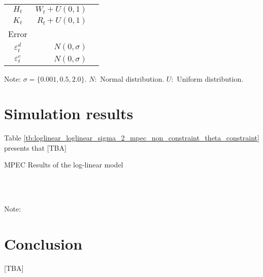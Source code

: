 \documentclass[11pt, a4paper]{article}
\begin{document}
\begin{table}[!htbp]
\begin{center}
{\begin{tabular}{crr}
            $H_{t}$ & $W_{t}+U(0,1)$  \\
            $K_{t}$ & $R_{t}+U(0,1)$  \\
            Error&  &  \\
            $\varepsilon^{d}_{t}$ & $N(0,\sigma)$  \\
            $\varepsilon^{c}_{t}$ & $N(0,\sigma)$ \\
            \hline
        \end{tabular}
    }
    \end{center}
    \footnotesize
    Note: $\sigma=\{0.001, 0.5, 2.0\}$. $N:$ Normal distribution. $U:$ Uniform distribution.
\end{table}




\section{Simulation results}\label{sec:results}

Table \ref{tb:loglinear_loglinear_sigma_2_mpec_non_constraint_theta_constraint} presents that [TBA]


\begin{table}[!htbp]
  \begin{center}
      \caption{MPEC Results of the log-linear model}
      \label{tb:loglinear_loglinear_sigma_2_mpec_non_constraint_theta_constraint} 
      \subfloat[$\sigma=0.001$]{}\\
      \subfloat[$\sigma=0.5$]{}\\
    \subfloat[$\sigma=2.0$]{}
  \end{center}
  \footnotesize
  Note: 
\end{table} 



\section{Conclusion}
[TBA]
\end{document}

